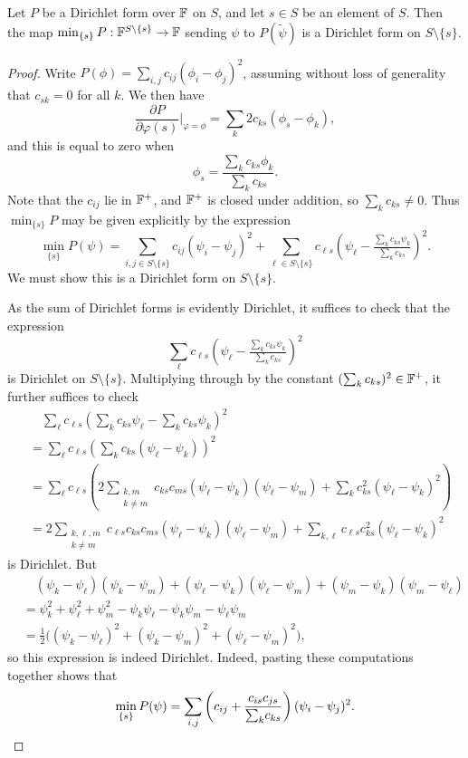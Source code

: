 \begin{lemma} \label{lem:onestepdirichletmin}
  Let $P$ be a Dirichlet form over ${\mathbb F}$ on $S$, and let $s \in S$ be an element
  of $S$. Then the map $\min_{\{s\}} P:{\mathbb F}^{S \setminus\{s\}} \to {\mathbb F}$ sending
  $\psi$ to $P(\tilde\psi)$ is a Dirichlet form on $S \setminus \{s\}$.
\end{lemma}
\begin{proof}
  Write $P(\phi) = \sum_{i,j} c_{ij}(\phi_i -\phi_j)^2$, assuming without loss
  of generality that $c_{sk} =0$ for all $k$. We then have
  \[
    \frac{\partial P}{\partial \varphi(s)}\bigg\vert_{\varphi = \phi} = \sum_k
    2c_{ks}(\phi_s-\phi_k),
  \]
  and this is equal to zero when
  \[
    \phi_s = \frac{\sum_k c_{ks}\phi_k}{\sum_k c_{ks}}.
  \]
  Note that the $c_{ij}$ lie in ${\mathbb F}^+$, and ${\mathbb F}^+$ is closed under addition, so
  $\sum_k c_{ks} \ne 0$. Thus $\min_{\{s\}}P$ may be given explicitly by the
  expression
  \[
    \min_{\{s\}} P(\psi) = \sum_{i,j \in S \setminus \{s\}} c_{ij}(\psi_i -\psi_j)^2 +
    \sum_{\ell \in S \setminus \{s\}} c_{\ell s}\left(\psi_\ell - \tfrac{\sum_k
      c_{ks} \psi_k}{\sum_k c_{ks}}\right)^2.
  \]
  We must show this is a Dirichlet form on $S \setminus \{s\}$. 
  
  As the sum of Dirichlet forms is evidently Dirichlet, it suffices to check that the expression 
  \[
    \sum_\ell c_{\ell s}\left(\psi_\ell - \tfrac{\sum_k c_{ks} \psi_k}{\sum_k
      c_{ks}}\right)^2
  \]
  is Dirichlet on $S \setminus \{s\}$. Multiplying through by the constant
  $(\sum_k c_{ks})^2 \in {\mathbb F}^+$, it further suffices to check
  \begin{align*}
    &\quad \sum_\ell c_{\ell s}\left(\sum_k c_{ks} \psi_\ell - \sum_k c_{ks}
    \psi_k\right)^2 \\
    &= \sum_\ell c_{\ell s} \left(\sum_k c_{ks} (\psi_\ell -
    \psi_k)\right)^2 \\
    &= \sum_\ell c_{\ell s} \left(2 \sum_{\substack{k,m \\ k \ne m}} c_{k s} c_{ms}
    (\psi_\ell-\psi_k)(\psi_\ell - \psi_m) + \sum_{k} c_{k
    s}^2(\psi_\ell-\psi_k)^2\right) \\
    &= 2\sum_{\substack{k,\ell,m \\ k \ne m}} c_{\ell s} c_{k s} c_{ms}
    (\psi_\ell-\psi_k)(\psi_\ell - \psi_m) + \sum_{k, \ell} c_{\ell s}c_{k
    s}^2(\psi_\ell-\psi_k)^2
  \end{align*}
  is Dirichlet. But
  \begin{align*}
    &\quad (\psi_k - \psi_\ell)(\psi_k - \psi_m)+(\psi_\ell - \psi_k)(\psi_\ell -
    \psi_m) + (\psi_m-\psi_k)(\psi_m-\psi_\ell) \\ 
    &= \psi_k^2+\psi_\ell^2+\psi_m^2-\psi_k\psi_\ell- \psi_k\psi_m -
    \psi_\ell\psi_m \\
    &= \tfrac12\big( (\psi_k-\psi_\ell)^2 +(\psi_k-\psi_m)^2
    +(\psi_\ell-\psi_m)^2\big),
  \end{align*}
  so this expression is indeed Dirichlet. Indeed, pasting these computations
  together shows that
  \[
    \min_{\{s\}}P(\psi) = \sum_{i,j} \left(c_{ij}+\frac{c_{is}c_{js}}{{\textstyle \sum_k}
    c_{ks}}\right)(\psi_i-\psi_j)^2. \qedhere
  \]
\end{proof}

